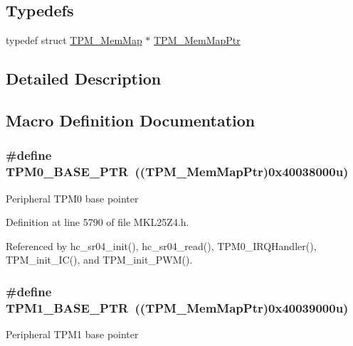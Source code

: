 \subsection*{Typedefs}
\begin{DoxyCompactItemize}
\item 
typedef struct \hyperlink{struct_t_p_m___mem_map}{T\+P\+M\+\_\+\+Mem\+Map} $\ast$ \hyperlink{group___t_p_m___peripheral_ga32147338cedc9904efff0d19b3a358ac}{T\+P\+M\+\_\+\+Mem\+Map\+Ptr}
\end{DoxyCompactItemize}


\subsection{Detailed Description}


\subsection{Macro Definition Documentation}
\subsubsection[{\texorpdfstring{T\+P\+M0\+\_\+\+B\+A\+S\+E\+\_\+\+P\+TR}{TPM0_BASE_PTR}}]{\setlength{\rightskip}{0pt plus 5cm}\#define T\+P\+M0\+\_\+\+B\+A\+S\+E\+\_\+\+P\+TR~(({\bf T\+P\+M\+\_\+\+Mem\+Map\+Ptr})0x40038000u)}\hypertarget{group___t_p_m___peripheral_ga8ba6c6fb69345639750108c3289a24c4}{}\label{group___t_p_m___peripheral_ga8ba6c6fb69345639750108c3289a24c4}
Peripheral T\+P\+M0 base pointer 

Definition at line 5790 of file M\+K\+L25\+Z4.\+h.



Referenced by hc\+\_\+sr04\+\_\+init(), hc\+\_\+sr04\+\_\+read(), T\+P\+M0\+\_\+\+I\+R\+Q\+Handler(), T\+P\+M\+\_\+init\+\_\+\+I\+C(), and T\+P\+M\+\_\+init\+\_\+\+P\+W\+M().

\subsubsection[{\texorpdfstring{T\+P\+M1\+\_\+\+B\+A\+S\+E\+\_\+\+P\+TR}{TPM1_BASE_PTR}}]{\setlength{\rightskip}{0pt plus 5cm}\#define T\+P\+M1\+\_\+\+B\+A\+S\+E\+\_\+\+P\+TR~(({\bf T\+P\+M\+\_\+\+Mem\+Map\+Ptr})0x40039000u)}\hypertarget{group___t_p_m___peripheral_ga3c3f533f8c87c74f2bbc3a4de83d1181}{}\label{group___t_p_m___peripheral_ga3c3f533f8c87c74f2bbc3a4de83d1181}
Peripheral T\+P\+M1 base pointer 

